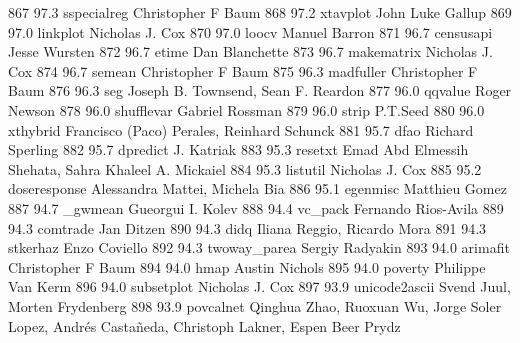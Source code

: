    867     97.3    sspecialreg   Christopher F Baum                      
   868     97.2    xtavplot      John Luke Gallup                        
   869     97.0    linkplot      Nicholas J. Cox                         
   870     97.0    loocv         Manuel Barron                           
   871     96.7    censusapi     Jesse Wursten                           
   872     96.7    etime         Dan Blanchette                          
   873     96.7    makematrix    Nicholas J. Cox                         
   874     96.7    semean        Christopher F Baum                      
   875     96.3    madfuller     Christopher F Baum                      
   876     96.3    seg           Joseph B. Townsend, Sean F. Reardon     
   877     96.0    qqvalue       Roger Newson                            
   878     96.0    shufflevar    Gabriel Rossman                         
   879     96.0    strip         P.T.Seed                                
   880     96.0    xthybrid      Francisco (Paco) Perales, Reinhard      
                                   Schunck                                 
   881     95.7    dfao          Richard Sperling                        
   882     95.7    dpredict      J. Katriak                              
   883     95.3    resetxt       Emad Abd Elmessih Shehata, Sahra        
                                   Khaleel A. Mickaiel                     
   884     95.3    listutil      Nicholas J. Cox                         
   885     95.2    doseresponse  Alessandra Mattei, Michela Bia          
   886     95.1    egenmisc      Matthieu Gomez                          
   887     94.7    _gwmean       Gueorgui I. Kolev                       
   888     94.4    vc_pack       Fernando Rios-Avila                     
   889     94.3    comtrade      Jan Ditzen                              
   890     94.3    didq          Iliana Reggio, Ricardo Mora             
   891     94.3    stkerhaz      Enzo Coviello                           
   892     94.3    twoway_parea  Sergiy Radyakin                         
   893     94.0    arimafit      Christopher F Baum                      
   894     94.0    hmap          Austin Nichols                          
   895     94.0    poverty       Philippe Van Kerm                       
   896     94.0    subsetplot    Nicholas J. Cox                         
   897     93.9    unicode2ascii  Svend Juul, Morten Frydenberg           
   898     93.9    povcalnet     Qinghua Zhao, Ruoxuan Wu, Jorge Soler   
                                   Lopez, Andrés Castañeda, Christoph    
                                   Lakner, Espen Beer Prydz                
